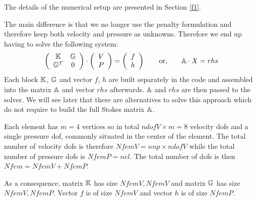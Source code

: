 The details of the numerical setup are presented in Section \ref{f1}.

The main difference is that we no longer use the penalty formulation and therefore 
keep both velocity and pressure as unknowns. Therefore we end up having to solve 
the following system:
\[
\left(
\begin{array}{cc}
{\mathbb{K}} & {\mathbb{G}} \\ {\mathbb{G}}^T & 0 
\end{array}
\right)
\cdot
\left(
\begin{array}{c}
V \\ P
\end{array}
\right)
=
\left(
\begin{array}{c}
 f \\ h
\end{array}
\right)
\quad\quad
{\rm or,}
\quad\quad
{\mathbb{A}} \cdot X = rhs
\]
Each block ${\mathbb{K}}$, ${\mathbb{G}}$ and vector $f$, $h$ are built separately in the code and assembled into 
the matrix ${\mathbb{A}}$ and vector $rhs$ afterwards. ${\mathbb{A}}$ and $rhs$ are then passed to the solver. 
We will see later that there are alternatives to solve this approach which do not require to 
build the full Stokes matrix ${\mathbb{A}}$. 

Each element has $m=4$ vertices so in total $ndofV\times m=8$ velocity dofs and a single 
pressure dof, commonly situated in the center of the element. The total number of 
velocity dofs is therefore $NfemV=nnp \times ndofV$ while the total number of
pressure dofs is $NfemP=nel$. The total number of dofs is then $Nfem=NfemV+NfemP$.

As a consequence, matrix ${\mathbb{K}}$ has size $NfemV,NfemV$ and matrix ${\mathbb{G}}$ has size $NfemV,NfemP$.
Vector $f$ is of size $NfemV$ and vector $h$ is of size $NfemP$.  



